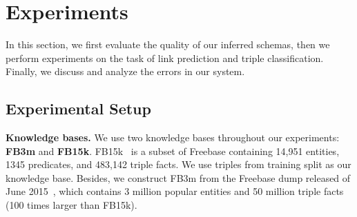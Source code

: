 \section{Experiments}
\label{sec:eval}

In this section, we first evaluate the quality of our inferred schemas,
then we perform experiments on the task of link prediction and triple classification.
Finally, we discuss and analyze the errors in our system.

\subsection{Experimental Setup}

\textbf{Knowledge bases.}
We use two knowledge bases throughout our experiments: {\bf FB3m} and {\bf FB15k}.
FB15k~\cite{bordes2013translating} is a subset of Freebase 
containing 14,951 entities, 1345 predicates, and 483,142 triple facts.
We use triples from training split as our knowledge base.
Besides, we construct FB3m from the Freebase dump released of June 2015~\cite{freebase:datadumps},
which contains 3 million popular entities and 50 million triple facts (100 times larger than FB15k).

